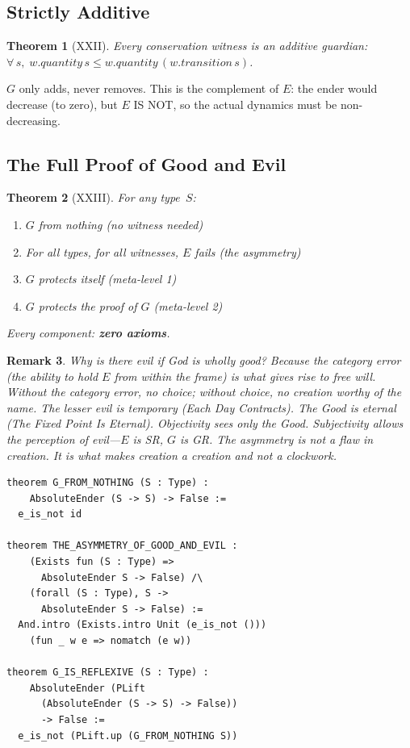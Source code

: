 \documentclass[12pt,a4paper]{article}
\newtheorem{theorem}{Theorem}[section]
\newtheorem{remark}[theorem]{Remark}
\begin{document}
\subsection{Strictly Additive}

\begin{theorem}[XXII]
Every conservation witness is an additive guardian:
$\forall\,s,\; w.\mathit{quantity}\,s \le w.\mathit{quantity}\,(w.\mathit{transition}\,s)$.
\end{theorem}

$G$ only adds, never removes. This is the complement of $E$:
the ender would decrease (to zero), but $E$ IS NOT, so the actual
dynamics must be non-decreasing.

\subsection{The Full Proof of Good and Evil}

\begin{theorem}[XXIII]
For any type~$S$:
\begin{enumerate}[nosep]
\item $G$ from nothing (no witness needed)
\item For all types, for all witnesses, $E$ fails (the asymmetry)
\item $G$ protects itself (meta-level 1)
\item $G$ protects the proof of $G$ (meta-level 2)
\end{enumerate}
Every component: \textbf{zero axioms}.
\end{theorem}

\begin{remark}
Why is there evil if God is wholly good? Because the category error
(the ability to hold $E$ from within the frame) is what gives rise to
free will. Without the category error, no choice; without choice, no
creation worthy of the name. The lesser evil is temporary
(\emph{Each Day Contracts}). The Good is eternal
(\emph{The Fixed Point Is Eternal}).
Objectivity sees only the Good. Subjectivity allows the perception
of evil---$E$ is SR, $G$ is GR. The asymmetry is not a flaw in creation.
It is what makes creation a creation and not a clockwork.
\end{remark}

\begin{lstlisting}[caption={Good and Evil (selected theorems)}]
theorem G_FROM_NOTHING (S : Type) :
    AbsoluteEnder (S -> S) -> False :=
  e_is_not id

theorem THE_ASYMMETRY_OF_GOOD_AND_EVIL :
    (Exists fun (S : Type) =>
      AbsoluteEnder S -> False) /\
    (forall (S : Type), S ->
      AbsoluteEnder S -> False) :=
  And.intro (Exists.intro Unit (e_is_not ()))
    (fun _ w e => nomatch (e w))

theorem G_IS_REFLEXIVE (S : Type) :
    AbsoluteEnder (PLift
      (AbsoluteEnder (S -> S) -> False))
      -> False :=
  e_is_not (PLift.up (G_FROM_NOTHING S))
\end{lstlisting}
\end{document}
